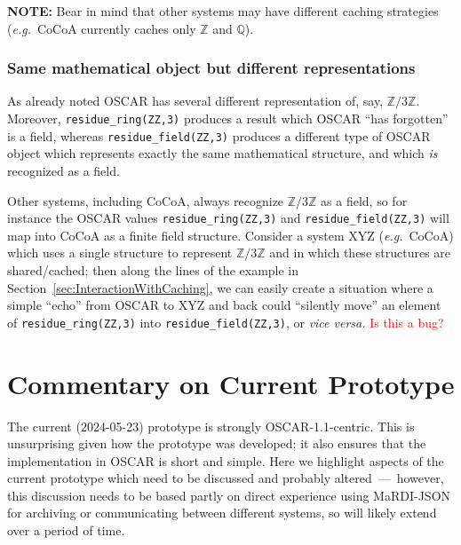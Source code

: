 \documentclass{article}
\newcommand{\MaRDIJSON}{MaRDI-JSON}
\newcommand \eg {\textit{e.g.}}
\newcommand \QQ {{\mathbb Q}}
\newcommand \ZZ {{\mathbb Z}}
\def\red#1{\textcolor{red}{#1}}
\begin{document}
\textbf{NOTE:} Bear in mind that other systems may have different
caching strategies (\eg~CoCoA currently caches only $\ZZ$ and $\QQ$).


\subsubsection{Same mathematical object but different representations}

As already noted OSCAR has several different representation of, say,
$\ZZ/3\ZZ$.  Moreover, \verb|residue_ring(ZZ,3)| produces a result
which OSCAR ``has forgotten'' is a field, whereas
\verb|residue_field(ZZ,3)| produces a different type of OSCAR object
which represents exactly the same mathematical structure, and which
\textit{is} recognized as a field.

Other systems, including CoCoA, always recognize $\ZZ/3\ZZ$ as a
field, so for instance the OSCAR values \verb|residue_ring(ZZ,3)| and
\verb|residue_field(ZZ,3)| will map into CoCoA as a finite field
structure.  Consider a system XYZ (\eg~CoCoA) which uses a single
structure to represent $\ZZ/3\ZZ$ and in which these structures are
shared/cached; then along the lines of the example in
Section~\ref{sec:InteractionWithCaching}, we can easily create a
situation where a simple ``echo'' from OSCAR to XYZ and back could
``silently move'' an element of \verb|residue_ring(ZZ,3)| into
\verb|residue_field(ZZ,3)|, or \textit{vice versa.}  \red{Is this a bug?}



\section{Commentary on Current Prototype}
\label{sec:commentary}

The current (2024-05-23) prototype is strongly OSCAR-1.1-centric.  This is
unsurprising given how the prototype was developed; it also ensures
that the implementation in OSCAR is short and simple.  Here we
highlight aspects of the current prototype which need to be discussed
and probably altered~---~however, this discussion needs to be based
partly on direct experience using {\MaRDIJSON} for archiving or
communicating between different systems, so will likely extend over a
period of time.
\end{document}
